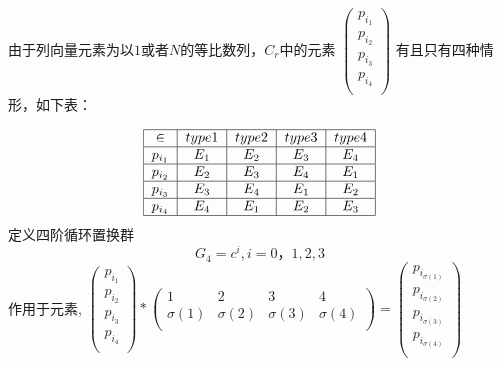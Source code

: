 \documentclass{amsc}          %
\numberwithin{equation}{section} %
\begin{document}
\begin{prof}
由于列向量元素为以$1$或者$N$的等比数列，$C_{r}$中的元素
$\left(
  \begin{array}{ccc}   %
    p_{i_{1}} \\  %
    p_{i_{2}} \\  %
    p_{i_{3}} \\
    p_{i_{4}} \\
  \end{array}              %
    \right)$
    有且只有四种情形，如下表：

\begin{equation}
\label{table1}\begin{tabular}{|c|c|c|c|c|}%
\hline  %
$\in$&$type1$&$type2$&$type3$&$type4$\\
\hline
$p_{i_{1}}$&$E_1$&$E_2$&$E_3$&$E_4$\\
\hline  %
$p_{i_{2}}$&$E_2$&$E_3$&$E_4$&$E_1$\\
\hline %
$p_{i_{3}}$&$E_3$&$E_4$&$E_1$&$E_2$\\
\hline %
$p_{i_{4}}$&$E_4$&$E_1$&$E_2$&$E_3$\\
\hline %
\end{tabular}
\end{equation}
定义四阶循环置换群
$$ G_{4} = {c^{i},i=0，1,2,3}$$
作用于元素,
$\left(
  \begin{array}{ccc}   %
    p_{i_{1}} \\  %
    p_{i_{2}} \\  %
    p_{i_{3}} \\
    p_{i_{4}} \\
  \end{array}              %
    \right)* \left(
\begin{array}{cccc}   %
1 & 2& 3 & 4\\  %
\sigma(1)& \sigma(2) & \sigma(3) & \sigma(4)\\  %
\end{array}\right)
= \left(
  \begin{array}{ccc}   %
    p_{i_{\sigma(1)}} \\  %
    p_{i_{\sigma(2)}} \\  %
    p_{i_{\sigma(3)}} \\
    p_{i_{\sigma(4)}} \\
  \end{array}              %
    \right)$


\end{prof}
\end{document}
